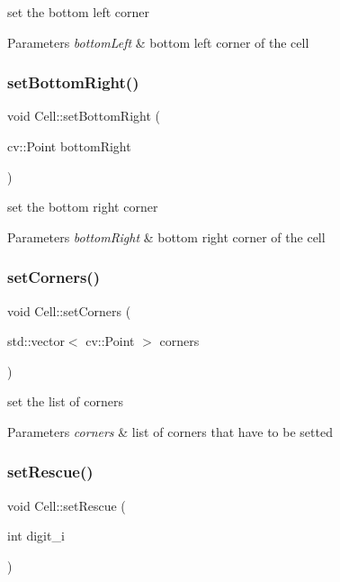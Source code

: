 set the bottom left corner 
\begin{DoxyParams}{Parameters}
{\em bottom\+Left} & bottom left corner of the cell \\
\hline
\end{DoxyParams}
\mbox{\label{class_cell_ae68ff90cfde34cec208e8e74ce3f2745}} 
\subsubsection{\texorpdfstring{set\+Bottom\+Right()}{setBottomRight()}}
{\footnotesize\ttfamily void Cell\+::set\+Bottom\+Right (\begin{DoxyParamCaption}\item[{cv\+::\+Point}]{bottom\+Right }\end{DoxyParamCaption})}

set the bottom right corner 
\begin{DoxyParams}{Parameters}
{\em bottom\+Right} & bottom right corner of the cell \\
\hline
\end{DoxyParams}
\mbox{\label{class_cell_a6d1ad0f2766cdd641ba0e65f8b3c9555}} 
\subsubsection{\texorpdfstring{set\+Corners()}{setCorners()}}
{\footnotesize\ttfamily void Cell\+::set\+Corners (\begin{DoxyParamCaption}\item[{std\+::vector$<$ cv\+::\+Point $>$}]{corners }\end{DoxyParamCaption})}

set the list of corners 
\begin{DoxyParams}{Parameters}
{\em corners} & list of corners that have to be setted \\
\hline
\end{DoxyParams}
\mbox{\label{class_cell_afa194cda3c1e8f9be100c9a14fda7f9d}} 
\subsubsection{\texorpdfstring{set\+Rescue()}{setRescue()}}
{\footnotesize\ttfamily void Cell\+::set\+Rescue (\begin{DoxyParamCaption}\item[{int}]{digit\+\_\+i }\end{DoxyParamCaption})}

